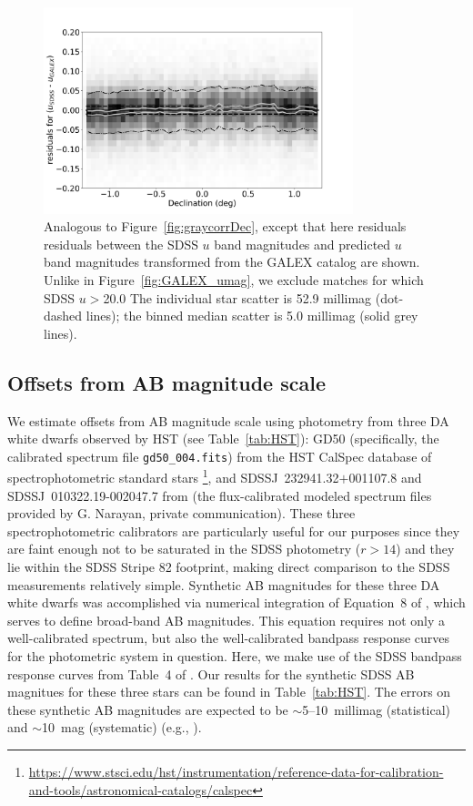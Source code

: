 \documentclass[fleqn,usenatbib]{mnras}
\begin{document}
\begin{figure}[th!]
    \centering\includegraphics[width=9cm]{figures/colorResidGALEXbright_du_est_Dec_Hess.png}
\caption{Analogous to Figure~\ref{fig:graycorrDec}, except that here
  residuals residuals between the SDSS $u$ band magnitudes and
  predicted $u$ band magnitudes transformed from the GALEX catalog are
  shown.  Unlike in Figure~\ref{fig:GALEX_umag}, we exclude matches
  for which SDSS $u$$>$20.0 The individual star scatter is 52.9
  millimag (dot-dashed lines); the binned median scatter is 5.0
  millimag (solid grey lines).  }
\label{fig:GALEX_Dec}
\end{figure}


\subsection{Offsets from AB magnitude scale \label{sec:AB}} 

We estimate offsets from AB magnitude scale using photometry from three DA white dwarfs observed by HST (see Table~\ref{tab:HST}): GD50 (specifically, the calibrated spectrum file {\tt gd50\_004.fits}) from the HST CalSpec database of spectrophotometric standard stars \citep{2014PASP..126..711B}\footnote{\url{https://www.stsci.edu/hst/instrumentation/reference-data-for-calibration-and-tools/astronomical-catalogs/calspec}}, and SDSSJ~232941.32$+$001107.8 and SDSSJ~010322.19-002047.7 from \citet{2019ApJS..241...20N}
(the flux-calibrated modeled spectrum files provided by G. Narayan, private communication).  These three spectrophotometric calibrators are particularly useful for our purposes since they are faint enough not to be saturated in the SDSS photometry ($r>14$) and they lie within the SDSS Stripe 82 footprint, making direct comparison to the SDSS measurements relatively simple.  Synthetic AB magnitudes for these three DA white dwarfs was accomplished via numerical integration of Equation~8 of \citet{1996AJ....111.1748F}, which serves to define broad-band AB magnitudes.  This equation requires not only a well-calibrated spectrum, but also the well-calibrated bandpass response curves for the photometric system in question.  Here, we make use of the SDSS bandpass response curves from Table~4 of \citet{2010AJ....139.1628D}.  Our results for the synthetic SDSS AB magnitues for these three stars can be found in Table~\ref{tab:HST}.  The errors on these synthetic AB magnitudes are expected to be $\sim$5--10~millimag (statistical) and $\sim$10~mag (systematic) (e.g., \citet{2014PASP..126..711B}).  
\end{document}
